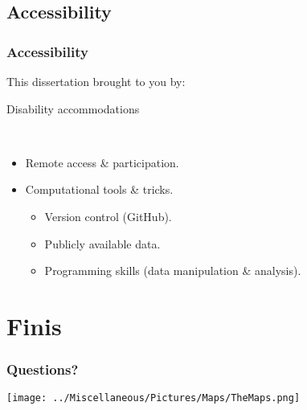 \documentclass[14pt]{beamer}
\begin{document}
\subsection{Accessibility}
\begin{frame}[t]{}
\frametitle{Accessibility}
\begin{center}
This dissertation brought to you by:
\end{center}
\begin{Large}
Disability accommodations\\
\end{Large}
~\\
\begin{itemize}
\item Remote access \& participation.\\
\item Computational tools \& tricks.
\begin{itemize}
\item Version control (GitHub).
\item Publicly available data.
\item Programming skills (data manipulation \& analysis).
\end{itemize}
\end{itemize}
\end{frame}

\section{Finis}
\begin{frame}[t]
\frametitle{Questions?}
\begin{center}
\texttt{[image: ../Miscellaneous/Pictures/Maps/TheMaps.png]}
\end{center}
\end{frame}
\end{document}
